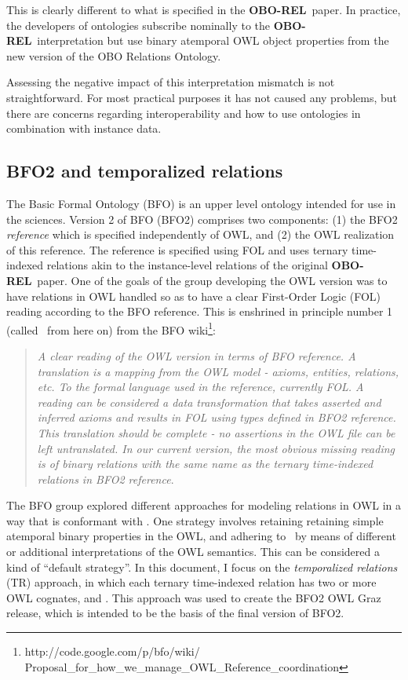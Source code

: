 \documentclass{bioinfo}
\def\P1{\pr{P-1}}
\def\OBOREL{\textbf{OBO-REL}}
\begin{document}
This is clearly different to what is specified in the \OBOREL\ paper.
In practice, the developers of ontologies subscribe nominally to the
\OBOREL\ interpretation but use binary atemporal OWL object properties
from the new version of the OBO Relations Ontology\cite{RO2010}.

Assessing the negative impact of this interpretation mismatch is not
straightforward. For most practical purposes it has not caused any
problems, but there are concerns regarding interoperability and how to
use ontologies in combination with instance data.

\subsection{BFO2 and temporalized relations}

The Basic Formal Ontology (BFO) is an upper level ontology intended
for use in the sciences\cite{Grenon2004}. Version 2 of BFO (BFO2)
comprises two components: (1) the BFO2 \emph{reference}\cite{BFO2Ref}
which is specified independently of OWL, and (2) the OWL realization
of this reference. The reference is specified using FOL and uses
ternary time-indexed relations akin to the instance-level relations of
the original \OBOREL\ paper. One of the goals of the group developing
the OWL version was to have relations in OWL handled so as to have a
clear First-Order Logic (FOL) reading according to the BFO
reference. This is enshrined in principle number 1 (called \P1\ from
here on) from the BFO
wiki\footnote{http://code.google.com/p/bfo/wiki/
  Proposal\_for\_how\_we\_manage\_OWL\_Reference\_coordination}:

\begin{quotation}
  \emph{A clear reading of the OWL version in terms of BFO reference. A
  translation is a mapping from the OWL model - axioms, entities,
  relations, etc. To the formal language used in the reference,
  currently FOL. A reading can be considered a data transformation
  that takes asserted and inferred axioms and results in FOL using
  types defined in BFO2 reference. This translation should be complete
  - no assertions in the OWL file can be left untranslated. In our
  current version, the most obvious missing reading is of binary
  relations with the same name as the ternary time-indexed relations
  in BFO2 reference}.
\end{quotation}

The BFO group explored different approaches for modeling relations in
OWL in a way that is conformant with \P1. One strategy involves
retaining retaining simple atemporal binary properties in the OWL, and
adhering to \P1\ by means of different or additional interpretations
of the OWL semantics\cite{Grewe}. This can be considered a kind of
``default strategy''.  In this document, I focus on the
\emph{temporalized relations} (TR) approach, in which each ternary
time-indexed relation has two or more OWL cognates,
 and . This approach was
used to create the BFO2 OWL Graz release\cite{Graz}, which is intended
to be the basis of the final version of BFO2.
\end{document}
